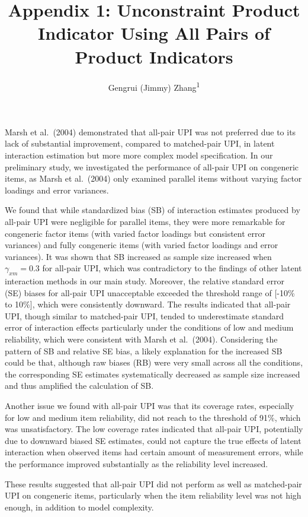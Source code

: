 \documentclass[
  man,mask]{apa6}
\title{Appendix 1: Unconstraint Product Indicator Using All Pairs of Product Indicators}
\author{Gengrui (Jimmy) Zhang\textsuperscript{1}}
\date{}
\affiliation{\vspace{0.5cm}\textsuperscript{1} University of Southhern California}
\begin{document}
\maketitle

Marsh et al.~(2004) demonstrated that all-pair UPI was not preferred due to its lack of substantial improvement, compared to matched-pair UPI, in latent interaction estimation but more more complex model specification. In our preliminary study, we investigated the performance of all-pair UPI on congeneric items, as Marsh et al.~(2004) only examined parallel items without varying factor loadings and error variances.

We found that while standardized bias (SB) of interaction estimates produced by all-pair UPI were negligible for parallel items, they were more remarkable for congeneric factor items (with varied factor loadings but consistent error variances) and fully congeneric items (with varied factor loadings and error variances). It was shown that SB increased as sample size increased when \(\gamma_{xm} = 0.3\) for all-pair UPI, which was contradictory to the findings of other latent interaction methods in our main study. Moreover, the relative standard error (SE) biases for all-pair UPI unacceptable exceeded the threshold range of {[}-10\% to 10\%{]}, which were consistently downward. The results indicated that all-pair UPI, though similar to matched-pair UPI, tended to underestimate standard error of interaction effects particularly under the conditions of low and medium reliability, which were consistent with Marsh et al.~(2004). Considering the pattern of SB and relative SE bias, a likely explanation for the increased SB could be that, although raw biases (RB) were very small across all the conditions, the corresponding SE estimates systematically decreased as sample size increased and thus amplified the calculation of SB.

Another issue we found with all-pair UPI was that its coverage rates, especially for low and medium item reliability, did not reach to the threshold of 91\%, which was unsatisfactory. The low coverage rates indicated that all-pair UPI, potentially due to downward biased SE estimates, could not capture the true effects of latent interaction when observed items had certain amount of measurement errors, while the performance improved substantially as the reliability level increased.

These results suggested that all-pair UPI did not perform as well as matched-pair UPI on congeneric items, particularly when the item reliability level was not high enough, in addition to model complexity.
\end{document}
